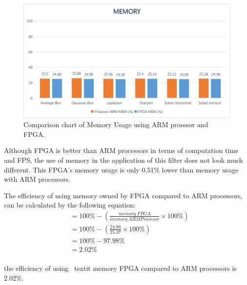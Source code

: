 \begin{figure}[H]
    \includegraphics[width=0.81\linewidth, center]{images/chart/chart-mem.png}
    \caption{Comparison chart of Memory Usage using ARM prosesor and FPGA.}
    \label{fig:chart-mem}
\end{figure}


Although FPGA is better than ARM processors in terms of computation time and FPS, the use of memory in the application of this filter does not look much different. This FPGA's memory usage is only 0.51\% lower than memory usage with ARM processors.


The efficiency of using memory owned by FPGA compared to ARM processors, can be calculated by the following equation:
\begin{equation*}
    \begin{split}
& = 100\% - \left( \frac{memory\ FPGA}{memory\ ARM Prosesor} \times 100\% \right) \\
& = 100\% - \left( \frac{24.86}{25.37} \times 100\% \right) \\
& = 100\% - 97.98\% \\
& = 2.02\% \\
    \end{split}
\end{equation*}

the efficiency of using \ textit {memory} FPGA compared to ARM processors is 2.02\%.


